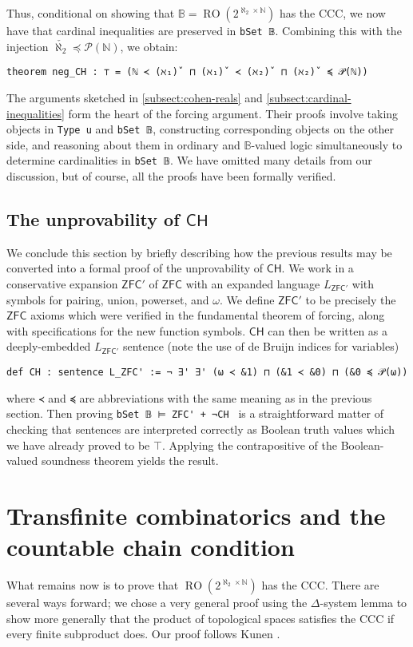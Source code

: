 \documentclass[a4paper,USenglish,cleveref, autoref]{lipics-v2019}
\newcommand{\B}{\mathbb{B}}
\newcommand{\lil}{\lstinline}
\theoremstyle{theorem}
\theoremstyle{definition}
\begin{document}
Thus, conditional on showing that $\B = \operatorname{RO}(2^{\aleph_2 \times \mathbb{N}})$ has the CCC, we now have that cardinal inequalities are preserved in \lstinline{bSet 𝔹}. Combining this with the injection $\check{\aleph_2} \preceq \mathcal{P}(\mathbb{N})$, we obtain:
\begin{lstlisting}
theorem neg_CH : ⊤ = (ℕ ≺ (ℵ₁)̌  ⊓ (ℵ₁)̌  ≺ (ℵ₂)̌  ⊓ (ℵ₂)̌  ≼ 𝒫(ℕ))
\end{lstlisting}

The arguments sketched in \autoref{subsect:cohen-reals} and \autoref{subsect:cardinal-inequalities} form the heart of the forcing argument. Their proofs involve taking objects in \lil{Type u} and \lil{bSet 𝔹}, constructing corresponding objects on the other side, and reasoning about them in ordinary and $\B$-valued logic simultaneously to determine cardinalities in \lstinline{bSet 𝔹}. We have omitted many details from our discussion, but of course, all the proofs have been formally verified.

\subsection{The unprovability of $\mathsf{CH}$}
We conclude this section by briefly describing how the previous results may be converted into a formal proof of the unprovability of $\mathsf{CH}$. We work in a conservative expansion $\mathsf{ZFC}'$ of $\mathsf{ZFC}$ with an expanded language $L_{\mathsf{ZFC}'}$ with symbols for pairing, union, powerset, and $\omega$. We define $\mathsf{ZFC}'$ to be precisely the $\mathsf{ZFC}$ axioms which were verified in the fundamental theorem of forcing, along with specifications for the new function symbols. $\mathsf{CH}$ can then be written as a deeply-embedded $L_{\mathsf{ZFC}'}$ sentence (note the use of de Bruijn indices for variables)
\begin{lstlisting}
def CH : sentence L_ZFC' := ¬ ∃' ∃' (ω ≺ &1) ⊓ (&1 ≺ &0) ⊓ (&0 ≼ 𝒫(ω))
\end{lstlisting}
where \lil{≺} and \lil{≼} are abbreviations with the same meaning as in the previous section. Then proving \lstinline{bSet 𝔹 ⊨ ZFC' + ¬CH } is a straightforward matter of checking that sentences are interpreted correctly as Boolean truth values which we have already proved to be $\top$. Applying the contrapositive of the Boolean-valued soundness theorem yields the result.

\section{Transfinite combinatorics and the countable chain condition}
\label{sect:ccc}
What remains now is to prove that $\operatorname{RO}(2^{\aleph_2 \times \mathbb{N}})$ has the CCC. There are several ways forward; we chose a very general proof using the
$\Delta$-system lemma to show more generally that the product of topological spaces satisfies the CCC if every finite subproduct does. Our proof follows Kunen \cite{kunen2014set}.
\end{document}
